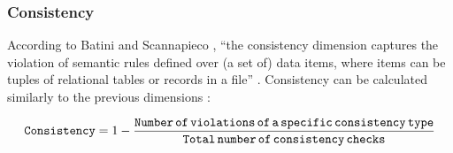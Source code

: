 				\subsubsection{Consistency}
				\label{subsec:consistency}

				According to Batini and Scannapieco \cite{Batini2006}, “the consistency dimension captures the violation of semantic rules defined over (a set of) data items, where items can be tuples of relational tables or records in a file” \cite{Batini2006}. Consistency can be calculated similarly to the previous dimensions \cite{Pipino2002}:
				
					\begin{equation}
					\label{eqn:consistency}
					{\operatorname{\mathtt{Consistency}}} = 1 - \frac{{\operatorname{\mathtt{Number}}}\,{\operatorname{\mathtt{of}}}\,{\operatorname{\mathtt{violations}}}\,{\operatorname{\mathtt{of}}}\,{\operatorname{\mathtt{a}}}\,{\operatorname{\mathtt{specific}}}\,{\operatorname{\mathtt{consistency}}}\,{\operatorname{\mathtt{type}}}}{{\operatorname{\mathtt{Total}}}\,{\operatorname{\mathtt{number}}}\,{\operatorname{\mathtt{of}}}\,{\operatorname{\mathtt{consistency}}}\,{\operatorname{\mathtt{checks}}}}
					\end{equation}
